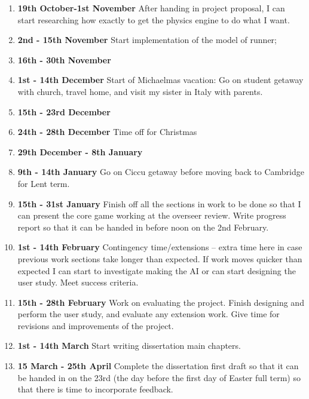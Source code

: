 \documentclass[12pt,a4paper,twoside]{article}
\begin{document}
\begin{enumerate}
\item \textbf{19th October-1st November} After handing in project proposal, I can start researching how exactly to get the physics engine to do what I want. 

\item \textbf{2nd - 15th November} Start implementation of the model of runner; \WorkA
\WorkB


\item \textbf{16th - 30th November}
\WorkC
\WorkD

\item \textbf{1st - 14th December}
Start of Michaelmas vacation: Go on student getaway with church, travel home, and visit my sister in Italy with parents.
\item \textbf{15th - 23rd December}
\WorkE
\WorkF
\item \textbf{24th - 28th December}
Time off for Christmas
\item \textbf{29th December - 8th January}
\WorkG
\WorkH
\item \textbf{9th - 14th January}
Go on Ciccu getaway before moving back to Cambridge for Lent term.

\item \textbf{15th - 31st January}
Finish off all the sections in work to be done so that I can present the core game working at the overseer review.
Write progress report so that it can be handed in before noon on the 2nd February.

\item \textbf{1st - 14th February}
Contingency time/extensions -- extra time here in case previous work sections take longer than expected. If work moves quicker than expected I can start to investigate making the AI or can start designing the user study.
Meet success criteria.


\item \textbf{15th - 28th February}
Work on evaluating the project. Finish designing and perform the user study, and evaluate any extension work.
Give time for revisions and improvements of the project.

\item \textbf{1st - 14th March}
Start writing dissertation main chapters.


\item \textbf{15 March - 25th April}
Complete the dissertation first draft so that it can be handed in on the 23rd (the day before the first day of Easter full term) so that there is time to incorporate feedback.


\end{enumerate}
\end{document}
